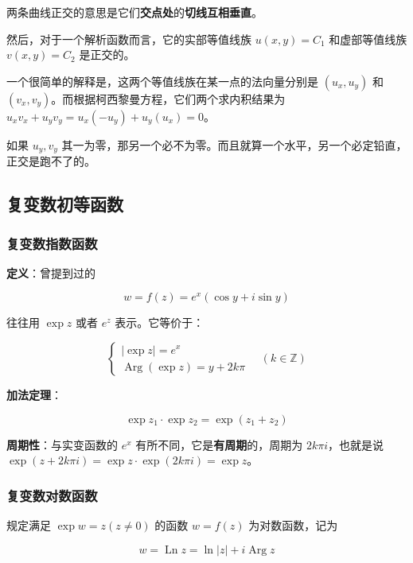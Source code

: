 \begin{tcolorbox}[title={顺带一提的怪东西},colback=red!5!white
,colframe=red!75!black
,colbacktitle=yellow!50!red
,coltitle=red!25!black, fonttitle=\bfseries,subtitle style={boxrule=0.4pt, colback=yellow!50!red!25!white}]
两条曲线正交的意思是它们\textbf{交点处}的\textbf{切线互相垂直}。

然后，对于一个解析函数而言，它的实部等值线族 \(u(x,y)=C_1\) 和虚部等值线族 \(v(x,y)=C_2\) 是正交的。

一个很简单的解释是，这两个等值线族在某一点的法向量分别是 \((u_x,u_y)\) 和 \((v_x,v_y)\)。而根据柯西黎曼方程，它们两个求内积结果为 \(u_xv_x+u_yv_y=u_x(-u_y)+u_y(u_x)=0\)。

如果 \(u_y,v_y\) 其一为零，那另一个必不为零。而且就算一个水平，另一个必定铅直，正交是跑不了的。

\end{tcolorbox}
\subsection{复变数初等函数}
\label{复变数初等函数}
\subsubsection{复变数指数函数}
\label{复变数指数函数}
\textbf{定义}：曾提到过的

\[
w=f(z)=e^x(\cos y +i\sin y)
\]

往往用 \(\exp z\) 或者 \(e^z\) 表示。它等价于：

\begin{equation*}
\begin{cases}
    |\exp z|=e^x\\
    \operatorname{Arg}(\exp z)=y+2k\pi
\end{cases}
\quad (k \in \mathbb{Z})
\end{equation*}

\textbf{加法定理}：

\[
\exp z_1 \cdot \exp z_2 = \exp (z_1+z_2)
\]

\textbf{周期性}：与实变函数的 \(e^x\) 有所不同，它是\textbf{有周期}的，周期为
\(2k\pi i\)，也就是说
\(\exp(z+2k\pi i)=\exp z \cdot \exp(2k\pi i)=\exp z\)。
\subsubsection{复变数对数函数}
\label{复变数对数函数}
规定满足 \(\exp w=z(z \ne 0)\) 的函数 \(w=f(z)\) 为对数函数，记为

\[
w=\operatorname{Ln}z=\ln |z|+i\operatorname{Arg}z
\]

